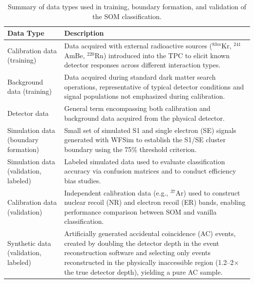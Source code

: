 \begin{table}[htbp]
\centering
\caption{Summary of data types used in training, boundary formation, and validation of the SOM classification.}
\label{tab:data_types}
\begin{tabular}{>{\raggedright\arraybackslash}p{4.2cm} p{10.3cm}@{}}
\toprule
\textbf{Data Type} & \textbf{Description} \\
\midrule
Calibration data (training) & Data acquired with external radioactive sources ($^{83m}$Kr, $^{241}$AmBe, $^{220}$Rn) introduced into the TPC to elicit known detector responses across different interaction types. \\[6pt]

Background data (training) & Data acquired during standard dark matter search operations, representative of typical detector conditions and signal populations not emphasized during calibration. \\[6pt]

Detector data & General term encompassing both calibration and background data acquired from the physical detector. \\[6pt]

Simulation data (boundary formation) & Small set of simulated S1 and single electron (SE) signals generated with WFSim to establish the S1/SE cluster boundary using the 75\% threshold criterion. \\[6pt]

Simulation data (validation, labeled) & Labeled simulated data used to evaluate classification accuracy via confusion matrices and to conduct efficiency bias studies. \\[6pt]

Calibration data (validation) & Independent calibration data (e.g., $^{37}$Ar) used to construct nuclear recoil (NR) and electron recoil (ER) bands, enabling performance comparison between SOM and vanilla classification. \\[6pt]

Synthetic data (validation, labeled) & Artificially generated accidental coincidence (AC) events, created by doubling the detector depth in the event reconstruction software and selecting only events reconstructed in the physically inaccessible region (1.2--2$\times$ the true detector depth), yielding a pure AC sample. \\
\bottomrule
\end{tabular}
\end{table}


